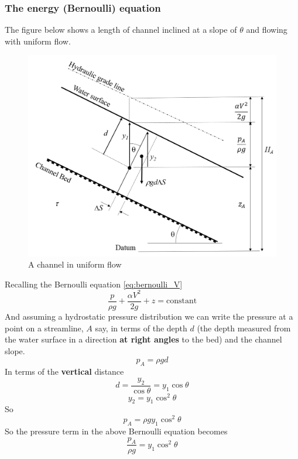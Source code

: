 \documentclass[a4paper, 12pt, british]{article} %
\numberwithin{equation}{section}
\numberwithin{figure}{section}
\numberwithin{table}{section}
\begin{document}
\subsubsection{The energy (Bernoulli) equation}
The figure below shows a length of channel inclined at a slope of $\theta$ and flowing with uniform flow.
 \begin{figure}[H]
 	\centering
 	\includegraphics[scale=0.45]{./images/uniform_flow_detail_2018.png}
 	\caption{A channel in uniform flow}
 	\label{fig:191}
 \end{figure} 
Recalling the Bernoulli equation \ref{eq:bernoulli_V}
  \begin{equation*}
 \frac{p}{\rho g}  + \frac{ \alpha V^2}{2g} + z  = \text{constant}
 \label{eq:bernoulli_V2}
 \end{equation*}
And assuming a hydrostatic pressure distribution we can write the pressure at a point on a streamline, $A$ say, in terms of the depth $d$ (the depth measured from the water surface in a direction \textbf{at right angles} to the bed) and the channel slope.
 \begin{equation}
 p_A = \rho g d
 \end{equation}
 In terms of the \textbf{vertical}  distance
  \begin{equation}
d = \frac{y_2}{\cos \theta} = y_1 \cos \theta
\end{equation}
  \begin{equation}
y_2 = y_1 \cos^2 \theta
\end{equation}
So
  \begin{equation}
p_A = \rho g  y_1 \cos^2 \theta
\end{equation} 
So the pressure term in the above Bernoulli equation becomes
  \begin{equation}
\frac{p_A}{\rho g}  = y_1 \cos^2 \theta
\end{equation}
\end{document}
